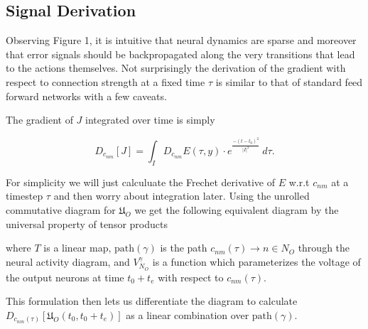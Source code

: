 \subsection{Signal Derivation}

Observing Figure 1, it is intuitive that neural dynamics are sparse and moreover that error signals should be backpropagated along the very transitions that lead to the actions themselves. Not surprisingly the derivation of the gradient with respect to connection strength at a fixed time $\tau$ is similar to that of standard feed forward networks with a few caveats. 

The gradient of $J$ integrated over time is simply

\begin{equation}
D_{c_{nm}} [J] = \int_I D_{c_{nm}}E(\tau, y)\cdot e^{\frac{-(t-t_0)^2}{|I|^2}}\ d\tau.
\end{equation}

For simplicity we will just calculuate the Frechet derivative of $E$ w.r.t $c_{nm}$ at a timestep $\tau$ and then worry about integration later. Using the unrolled commutative diagram for $\mathfrak{U}_O$ we get the following equivalent diagram by the universal property of tensor products
\begin{center}
	\end{center} 
	where $T$ is a linear map, $\text{path}(\gamma)$ is the path $c_{nm}(\tau) \to n \in N_O$ through the neural activity diagram, and $V_{N_O}^\gamma$ is a function which parameterizes the voltage of the output neurons at time $t_0 + t_e$ with respect to $c_{nm}(\tau)$. 

	This formulation then lets us differentiate the diagram to calculate $D_{c_{nm}(\tau)}\left[\mathfrak{U}_O(t_0,t_0+t_e)\right]$ as a linear combination over $\text{path}(\gamma).$

	\begin{center}
	\end{center}

